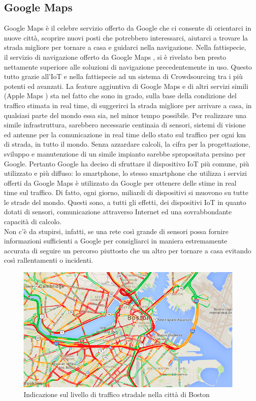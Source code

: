 \subsection{Google Maps}
Google Maps \textregistered \hspace{2mm} è il celebre servizio offerto da Google che ci consente di orientarci in nuove città, scoprire nuovi posti che potrebbero interessarci, aiutarci a trovare la strada migliore per tornare a casa e guidarci nella navigazione.
Nella fattispecie, il servizio di navigazione offerto da Google Maps \textregistered \hspace{2mm}, si è rivelato ben presto nettamente superiore alle soluzioni di navigazione precedentemente in uso. Questo tutto grazie all'IoT e nella fattispecie ad un sistema di Crowdsourcing tra i più potenti ed avanzati. La feature aggiuntiva di Google Maps \textregistered \hspace{2mm} e di altri servizi simili (Apple Maps \textregistered) sta nel fatto che sono in grado, sulla base della condizione del traffico stimata in real time, di suggerirci la strada migliore per arrivare a casa, in qualsiasi parte del mondo essa sia, nel minor tempo possibile. Per realizzare una simile infrastruttura, sarebbero necessarie centinaia di sensori, sistemi di visione ed antenne per la comunicazione in real time dello stato sul traffico per ogni km di strada, in tutto il mondo. Senza azzardare calcoli, la cifra per la progettazione, sviluppo e manutenzione di un simile impianto sarebbe spropositata persino per Google. Pertanto Google ha deciso di sfruttare il dispositivo IoT più comune, più utilizzato e più diffuso: lo smartphone, lo stesso smartphone che utilizza i servizi offerti da Google Maps \textregistered \hspace{2mm} è utilizzato da Google per ottenere delle stime in real time sul traffico. Di fatto, ogni giorno, miliardi di dispositivi si muovono su tutte le strade del mondo. Questi sono, a tutti gli effetti, dei dispositivi IoT in quanto dotati di sensori, comunicazione attraverso Internet ed una sovrabbondante capacità di calcolo.\\
Non c'è da stupirsi, infatti, se una rete così grande di sensori possa fornire informazioni sufficienti a Google per consigliarci in maniera estremamente accurata di seguire un percorso piuttosto che un altro per tornare a casa evitando così rallentamenti o incidenti.
\begin{figure}
	\begin{center}
		\includegraphics[width=0.7\columnwidth]{images/google_map_traffic}
	\end{center}
	\caption{Indicazione sul livello di traffico stradale nella città di Boston}
	\label{fig:google_map_traffic}
\end{figure}
